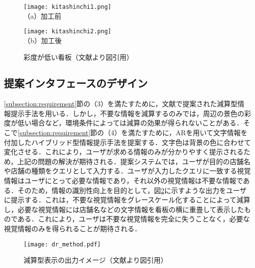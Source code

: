   \begin{figure}[t]
    \begin{minipage}{0.49\hsize}
        \begin{center}
          \texttt{[image: kitashinchi1.png]}\\
          \small{（a）加工前}
        \end{center}
    \end{minipage}
    \begin{minipage}{0.49\hsize}
        \begin{center}
          \texttt{[image: kitashinchi2.png]}\\
          \small{（b）加工後}
        \end{center}
    \end{minipage}
    \vspace{2pt}
    \caption{彩度が低い看板（文献\cite{Kitamura:2017a}より図引用）}
    \label{figure:kitashinchi}
  \end{figure}


  \subsection{提案インタフェースのデザイン}
    \ref{subsection:requirement}節の（3）を満たすために，文献\cite{Fujita:2013}で提案された減算型情報提示手法を用いる．しかし，不要な情報を減算するのみでは，周辺の景色の彩度が低い場合など，環境条件によっては減算の効果が得られないことがある．そこで\ref{subsection:requirement}節の（4）を満たすために，ARを用いて文字情報を付加したハイブリッド型情報提示手法を提案する．文字色は背景の色に合わせて変化させる．これにより，ユーザが求める情報のみが分かりやすく提示されるため，上記の問題の解決が期待される．提案システムでは，ユーザが目的の店舗名や店舗の種類をクエリとして入力する．ユーザが入力したクエリに一致する視覚情報はユーザにとって必要な情報であり，それ以外の視覚情報は不要な情報である．そのため，情報の識別性向上を目的として，図\ref{figure:dr_method}に示すような出力をユーザに提示する．これは，不要な視覚情報をグレースケール化することによって減算し，必要な視覚情報には店舗名などの文字情報を看板の横に重畳して表示したものである．これにより，ユーザは不要な視覚情報を完全に失うことなく，必要な視覚情報のみを得られることが期待される．

    \begin{figure}[tb]
      \centerline{\texttt{[image: dr\_method.pdf]}}
      \caption{減算型表示の出力イメージ（文献\cite{Kitamura:2017a}より図引用）}
      \label{figure:dr_method}
    \end{figure}


